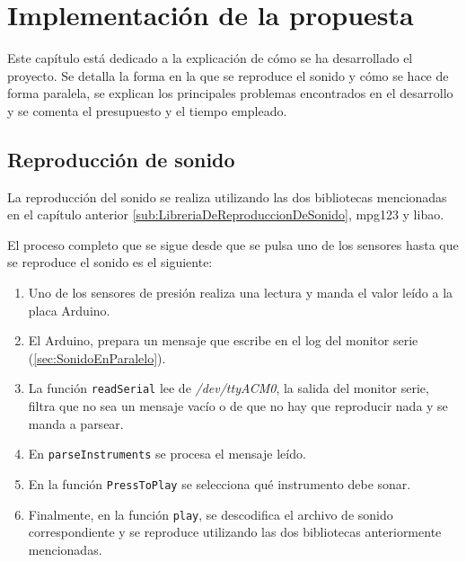 
\chapter{Implementación de la propuesta}
\label{cha:Implementacion}

    Este capítulo está dedicado a la explicación de cómo se ha desarrollado el proyecto. Se detalla la forma en la que
    se reproduce el sonido y cómo se hace de forma paralela, se explican los principales problemas encontrados en el
    desarrollo y se comenta el presupuesto y el tiempo empleado.

    \section{Reproducción de sonido} %
    \label{sec:ReproduccionDeSonido}

        La reproducción del sonido se realiza utilizando las dos bibliotecas mencionadas en el capítulo
        anterior \ref{sub:LibreriaDeReproduccionDeSonido}, mpg123 y libao.

        El proceso completo que se sigue desde que se pulsa uno de los sensores hasta que se reproduce el sonido es el
        siguiente:
        \begin{enumerate}
            \item Uno de los sensores de presión realiza una lectura y manda el valor leído a la placa Arduino.
            \item El Arduino, prepara un mensaje que escribe en el log del monitor serie (\ref{sec:SonidoEnParalelo}).
            \item La función \texttt{readSerial} lee de \textit{/dev/ttyACM0}, la salida del monitor serie, filtra que
            no sea un mensaje vacío o de que no hay que reproducir nada y se manda a parsear.
            \item En \texttt{parseInstruments} se procesa el mensaje leído.
            \item En la función \texttt{PressToPlay} se selecciona qué instrumento debe sonar.
            \item Finalmente, en la función \texttt{play}, se descodifica el archivo de sonido correspondiente y se
            reproduce utilizando las dos bibliotecas anteriormente mencionadas.
        \end{enumerate}

